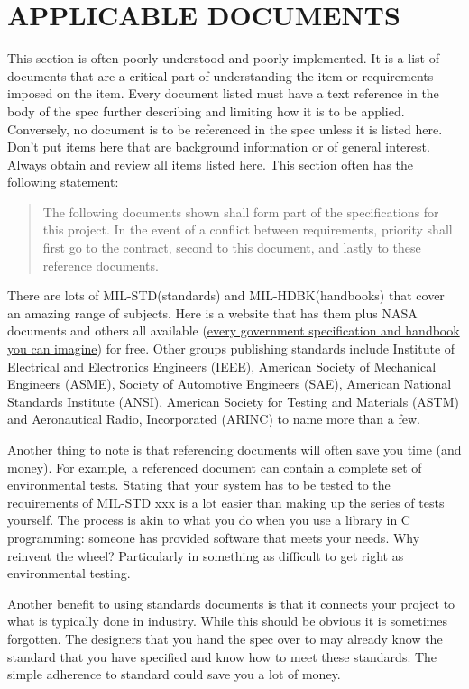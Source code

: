 \section{APPLICABLE DOCUMENTS}

\begin{slshape} \color{blue} This section is often poorly understood and poorly implemented.  It is a list of documents that are a critical part of understanding the item or requirements imposed on the item. Every document listed must have a text reference in the body of the spec further describing and limiting how it is to be applied. Conversely, no document is to be referenced in the spec unless it is listed here. Don't put items here that are background information or of general interest. Always obtain and review all items listed here. This section often has the following statement:
\bigskip

\begin{quote}
The following documents shown shall form part of the specifications for this project. In the event of a conflict between requirements, priority shall first go to the contract, second to this 
document, and lastly to these reference documents.
\end{quote}

\bigskip


There are lots of MIL-STD(standards) and MIL-HDBK(handbooks) that cover an amazing range of subjects.  Here is a website that has them plus NASA documents and others all available (\href{http://everyspec.com/}{every government specification and handbook you can imagine}) for free.  Other groups publishing standards include Institute of Electrical and Electronics Engineers (IEEE), American Society of Mechanical Engineers (ASME), Society of Automotive Engineers (SAE), American National Standards Institute (ANSI), American Society for Testing and Materials (ASTM) and Aeronautical Radio, Incorporated (ARINC) to name more than a few.
\bigskip


Another thing to note is that referencing documents will often save you time (and money).  For example, a referenced document can contain a complete set of environmental tests.  Stating that your system has to be tested to the requirements of MIL-STD xxx is a lot easier than making up the series of tests yourself.  The process is akin to what you do when you use a library in C programming: someone has provided software that meets your needs.  Why reinvent the wheel?  Particularly in something as difficult to get right as environmental testing.
\bigskip

Another benefit to using standards documents is that it connects your project to what is typically done in industry.  While this should be obvious it is sometimes forgotten.  The designers that you hand the spec over to may already know the standard that you have specified and know how to meet these standards.  The simple adherence to standard could save you a lot of money.
\bigskip


\end{slshape}



